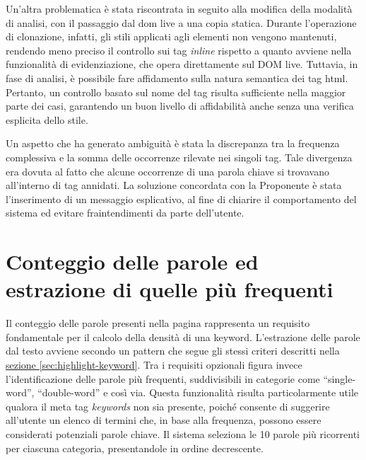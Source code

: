 \vspace{10pt}
\par\noindent Un’altra problematica è stata riscontrata in seguito alla modifica della modalità di analisi, con il passaggio dal \gls{dom} live a una copia statica. Durante l’operazione di clonazione, infatti, gli stili applicati agli elementi non vengono mantenuti, rendendo meno preciso il controllo sui tag \textit{inline} rispetto a quanto avviene nella funzionalità di evidenziazione, che opera direttamente sul DOM live. Tuttavia, in fase di analisi, è possibile fare affidamento sulla natura semantica dei tag \gls{html}. Pertanto, un controllo basato sul nome del tag risulta sufficiente nella maggior parte dei casi, garantendo un buon livello di affidabilità anche senza una verifica esplicita dello stile.

\vspace{10pt}
\par\noindent Un aspetto che ha generato ambiguità è stata la discrepanza tra la frequenza complessiva e la somma delle occorrenze rilevate nei singoli tag. Tale divergenza era dovuta al fatto che alcune occorrenze di una parola chiave si trovavano all’interno di tag annidati. La soluzione concordata con la Proponente è stata l’inserimento di un messaggio esplicativo, al fine di chiarire il comportamento del sistema ed evitare fraintendimenti da parte dell’utente.

\section{Conteggio delle parole ed estrazione di quelle più frequenti}
\label{sec:count-word}

\par Il conteggio delle parole presenti nella pagina rappresenta un requisito fondamentale per il calcolo della densità di una keyword. L'estrazione delle parole dal testo avviene secondo un pattern che segue gli stessi criteri descritti nella \hyperref[sec:highlight-keyword]{sezione \textsection\ref*{sec:highlight-keyword}}. Tra i requisiti opzionali figura invece l'identificazione delle parole più frequenti, suddivisibili in categorie come “single-word”, “double-word” e così via. Questa funzionalità risulta particolarmente utile qualora il meta tag \textit{keywords} non sia presente, poiché consente di suggerire all’utente un elenco di termini che, in base alla frequenza, possono essere considerati potenziali parole chiave. Il sistema seleziona le 10 parole più ricorrenti per ciascuna categoria, presentandole in ordine decrescente.

